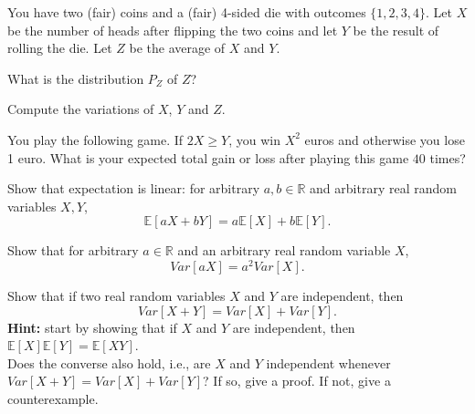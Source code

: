 \documentclass[a4paper,10pt,landscape,twocolumn]{scrartcl}
\begin{document}
\homeworkproblems

\begin{exercise}
	You have two (fair) coins and a (fair) 4-sided die with outcomes $\{1,2,3,4\}$. Let $X$ be the number of
	heads after flipping the two coins and let $Y$ be the result of rolling the
	die. Let $Z$ be the average of $X$ and $Y$.
	\begin{subex}[(2pt)]
		What is the distribution $P_Z$ of $Z$?
	\end{subex}
	\begin{subex}[(3pt)]
		Compute the variations of $X$, $Y$ and $Z$.	
	\end{subex}
	\begin{subex}[(2pt)]
		You play the following game. If $2X \ge Y$, you win $X^2$ euros and
		otherwise you lose 1 euro. What is your expected total gain or loss after
		playing this game $40$ times?
	\end{subex}
\end{exercise}

\begin{exercise}
	\begin{subex}[(2pt)]
		Show that expectation is linear: for arbitrary $a,b \in \mathbb{R}$ and arbitrary real random variables $X,Y$,
		\[
		\mathbb{E}[aX + bY] = a\mathbb{E}[X] + b \mathbb{E}[Y].
		\]
	\end{subex}
	\begin{subex}[(2pt)]
		Show that for arbitrary $a \in \mathbb{R}$ and an arbitrary real random variable $X$,
		\[
		Var[aX] = a^2Var[X].
		\]
	\end{subex}
	\begin{subex}[(3pt)]
		Show that if two real random variables $X$ and $Y$ are independent, then
		\[Var[X+Y] = Var[X] + Var[Y].\]
		\textbf{Hint:} start by showing that if $X$ and $Y$ are independent, then $\mathbb{E}[X]\mathbb{E}[Y] = \mathbb{E}[XY]$.
		\\ Does the converse also hold, i.e., are $X$ and $Y$ independent whenever $Var[X+Y] = Var[X] + Var[Y]$? If so, give a proof. If not, give a counterexample.
	\end{subex}
\end{exercise}
\end{document}
